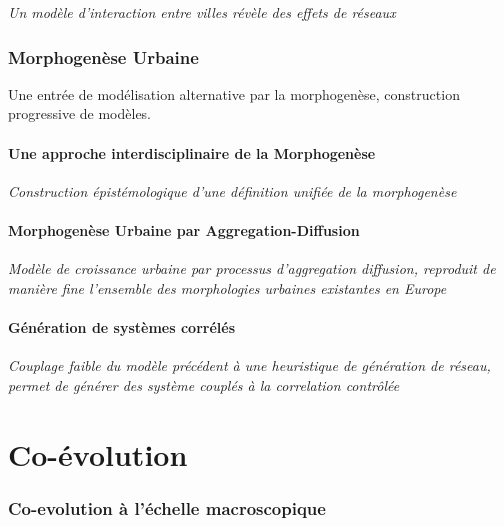 \textit{Un modèle d'interaction entre villes révèle des effets de réseaux}





\section{Morphogenèse Urbaine}

{\color{blue}Une entrée de modélisation alternative par la morphogenèse, construction progressive de modèles.}

\subsection{Une approche interdisciplinaire de la Morphogenèse}

\textit{Construction épistémologique d'une définition unifiée de la morphogenèse}


\subsection{Morphogenèse Urbaine par Aggregation-Diffusion}

\textit{Modèle de croissance urbaine par processus d'aggregation diffusion, reproduit de manière fine l'ensemble des morphologies urbaines existantes en Europe}


\subsection{Génération de systèmes corrélés}

\textit{Couplage faible du modèle précédent à une heuristique de génération de réseau, permet de générer des système couplés à la correlation contrôlée}





\part{Co-évolution}


\section{Co-evolution à l'échelle macroscopique}

